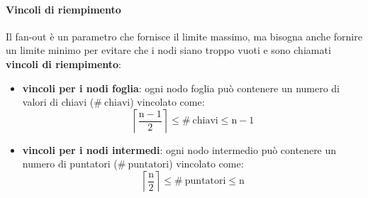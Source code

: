 \paragraph{Vincoli di riempimento}
Il fan-out è un parametro che fornisce il limite massimo, ma bisogna anche fornire un limite minimo per evitare che i nodi siano troppo vuoti e sono chiamati \textbf{vincoli di riempimento}:
\begin{itemize}[label=$\diamond$, itemsep=\medskipamount]
  \item \textbf{vincoli per i nodi foglia}: ogni nodo foglia può contenere un numero di valori di chiavi ($\mathrm{\# \ chiavi}$) vincolato come:
  \begin{equation*}
    \mathrm{\left\lceil \frac{n - 1}{2} \right\rceil \leq \# \ chiavi \leq n - 1}
  \end{equation*}
  \item \textbf{vincoli per i nodi intermedi}: ogni nodo intermedio può contenere un numero di puntatori ($\mathrm{\# \ puntatori}$) vincolato come:
  \begin{equation*}
    \mathrm{\left\lceil \frac{n}{2} \right\rceil \leq \# \ puntatori \leq n}
  \end{equation*}
\end{itemize}



